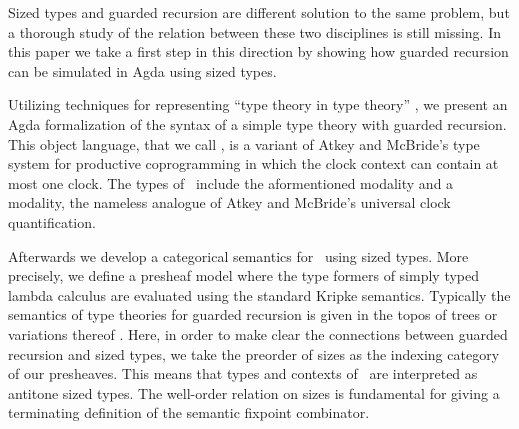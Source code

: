 



Sized types and guarded recursion are different solution to the same
problem, but a thorough study of the relation between these two
disciplines is still missing. In this paper we take a first step in
this direction by showing how guarded recursion can be simulated in
Agda using sized types. 

Utilizing techniques for representing ``type theory in type theory''
\cite{Chapman09,AltenkirchK16}, we present
an Agda formalization of the syntax of a simple type theory with
guarded recursion. This object language, that we call \GTT, is a variant of Atkey and
McBride's type system for productive coprogramming
\cite{atkey2013productive} in which the clock context can contain at
most one clock. The types of \GTT\ include the aformentioned  modality and a
  modality, the nameless analogue of  Atkey and
McBride's universal clock quantification.

Afterwards we develop a categorical semantics
for \GTT\ using sized types. More precisely, we define a presheaf
model where the type formers of simply typed lambda calculus are
evaluated using the standard Kripke semantics. Typically the semantics
of type theories for guarded recursion is given in the topos of
trees or variations thereof \cite{BMSS-synthetic,Mogelberg14,MannaaM18}.
Here, in order to make clear the connections between guarded recursion and
sized types, we take the preorder of sizes as the indexing
category of our presheaves. This means that types and contexts of \GTT\ are
interpreted as antitone sized types. 
The well-order relation on sizes is fundamental for giving a
terminating definition of the semantic fixpoint combinator. 

